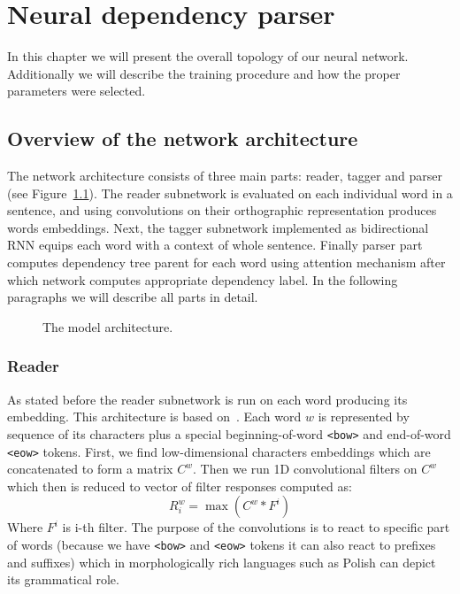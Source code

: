 \chapter{Neural dependency parser}
In this chapter we will present the overall topology of our neural network.
Additionally we will describe the training procedure and how the proper parameters
were selected.

\section{Overview of the network architecture}
The network architecture consists of three main parts: reader, tagger and parser
(see Figure~\ref{fig:architecture}). The reader subnetwork is evaluated on
each individual word in a sentence, and using convolutions on their orthographic
representation produces words embeddings. Next, the tagger subnetwork implemented
as bidirectional RNN equips each word with a context of whole sentence. Finally
parser part computes dependency tree parent for each word using attention mechanism
\cite{vinyals_pointer_2015} after which network computes appropriate dependency label.
In the following paragraphs we will describe all parts in detail.

\begin{figure}[!htbp]
  \centering
  \caption{The model architecture.} 
  \label{fig:architecture}
\end{figure}

\subsection{Reader}
As stated before the reader subnetwork is run on each word producing its embedding.
This architecture is based on~\cite{kim_character-aware_2015}. Each word $w$
is represented by sequence of its characters plus a special beginning-of-word \texttt{<bow>} and
end-of-word \texttt{<eow>} tokens. First, we find low-dimensional characters embeddings which
are concatenated to form a matrix $C^w$. Then we run 1D convolutional filters
on $C^w$ which then is reduced to vector of filter responses computed as:
\begin{equation} \label{eq:filter_responses}
    R^w_i = \max( C^w \ast F^i )
\end{equation}
Where $F^i$ is i-th filter. The purpose of the convolutions is to react to
specific part of words (because we have \texttt{<bow>} and \texttt{<eow>} tokens
it can also react to prefixes and suffixes) which in morphologically rich languages such as Polish
can depict its grammatical role.

